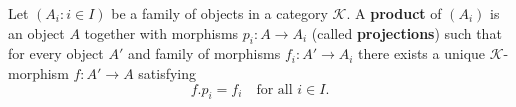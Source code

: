 Let $(A_i : i \in I)$ be a family of objects in a category $\mathcal{K}$. A \textbf{product} of $(A_i)$ is an object $A$ together with morphisms $p_i: A \longrightarrow A_i$ (called \textbf{projections}) such that for every object $A'$ and family of morphisms $f_i: A' \longrightarrow A_i$ there exists a unique $\mathcal{K}$-morphism $f: A' \longrightarrow A$ satisfying
$$f.p_i = f_i \quad \text{for all } i \in I.$$
